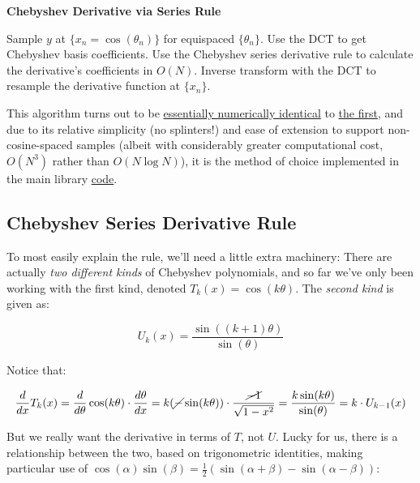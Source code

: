 \documentclass[10pt]{article}
\begin{document}
\begin{algorithm}
\caption*{\textbf{Chebyshev Derivative via Series Rule}}
\begin{algorithmic}[1] %
\STATE Sample $y$ at $\{x_n = \cos(\theta_n)\}$ for equispaced $\{\theta_n\}$.
\STATE Use the DCT to get Chebyshev basis coefficients.
\STATE Use the Chebyshev series derivative rule to calculate the derivative's coefficients in $O(N)$.
\STATE Inverse transform with the DCT to resample the derivative function at $\{x_n\}$.
\end{algorithmic}
\end{algorithm}

This algorithm turns out to be \href{https://github.com/pavelkomarov/spectral-derivatives/blob/main/notebooks/alternative_chebyshev_derivative_methods.ipynb}{essentially numerically identical} to \hyperref[algo]{the first}, and due to its relative simplicity (no splinters!) and ease of extension to support non-cosine-spaced samples (albeit with considerably greater computational cost, $O(N^3)$ rather than $O(N \log N)$), it is the method of choice implemented in the main library \href{https://github.com/pavelkomarov/spectral-derivatives/blob/main/specderiv/specderiv.py}{code}.

\subsection{Chebyshev Series Derivative Rule}\label{seriesrule}

To most easily explain the rule, we'll need a little extra machinery: There are actually \textit{two different kinds} of Chebyshev polynomials, and so far we've only been working with the first kind, denoted $T_k(x) = \cos(k\theta)$. The \textit{second kind} is given as:

$$U_k(x) = \frac{\sin((k+1)\theta)}{\sin(\theta)}$$

Notice that:

$$\frac{d}{dx} T_k(x) = \frac{d}{d\theta} \cos(k\theta) \cdot \frac{d\theta}{dx} = k(\cancel{-}\sin(k\theta)) \cdot \frac{\cancel{-1}}{\sqrt{1-x^2}} = \frac{k\sin(k\theta)}{\sin(\theta)} = k \cdot U_{k-1}(x)$$

But we really want the derivative in terms of $T$, not $U$. Lucky for us, there is a relationship between the two, based on trigonometric identities, making particular use of $\cos(\alpha)\sin(\beta) = \frac{1}{2}(\sin(\alpha + \beta) - \sin(\alpha - \beta))$:
\end{document}
